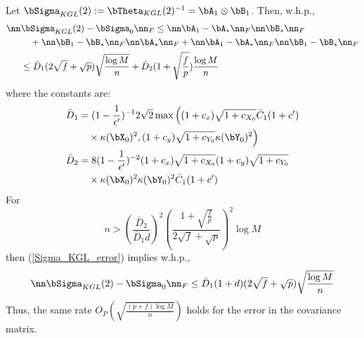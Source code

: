 \begin{IEEEproof}
Let $\bSigma_{KGL}(2):=\bTheta_{KGL}(2)^{-1}=\bA_1\otimes \bB_1$. Then, w.h.p.,
\begin{align}
	\nn & \bSigma_{KGL}(2)-\bSigma_0 \nn_F \leq \nn \bA_1-\bA_*\nn_F \nn \bB_*\nn_F \nonumber \\
		&\quad + \nn \bB_1-\bB_*\nn_F \nn \bA_*\nn_F + \nn\bA_1-\bA_*\nn_F \nn\bB_1-\bB_*\nn_F \nonumber \\
		&\leq \bar{D}_1 (2\sqrt{f}+\sqrt{p}) \sqrt{\frac{\log M}{n}} + \bar{D}_2 (1+\sqrt{\frac{f}{p}}) \frac{\log M}{n} \label{Sigma_KGL_error}
\end{align}
where the constants are:
\begin{align*}
	\bar{D}_1 &= (1-\frac{1}{\epsilon'})^{-1} 2\sqrt{2} \max\Big((1+c_x)\sqrt{1+c_{X_0}} \bar{C}_1 (1+c') \\
		&\quad \times \kappa(\bX_0)^2, (1+c_y) \sqrt{1+c_{Y_0}} \kappa(\bY_0)^2 \Big) \\
	\bar{D}_2 &= 8(1-\frac{1}{\epsilon'})^{-2} (1+c_x)\sqrt{1+c_{X_0}}(1+c_y)\sqrt{1+c_{Y_0}} \\
		&\quad \times \kappa(\bX_0)^2\kappa(\bY_0)^2 \bar{C}_1(1+c')
\end{align*}
For
\begin{equation*}
	n>(\frac{\bar{D}_2}{\bar{D}_1 d})^2 \left(\frac{1+\sqrt{\frac{f}{p}}}{2\sqrt{f}+\sqrt{p}}\right)^2 \log M
\end{equation*}
then (\ref{Sigma_KGL_error}) implies w.h.p.,
\begin{equation*}
	\nn \bSigma_{KGL}(2)-\bSigma_0 \nn_F \leq \bar{D}_1 (1+d) (2\sqrt{f}+\sqrt{p}) \sqrt{\frac{\log M}{n}}
\end{equation*}
Thus, the same rate $O_P\left( \sqrt{\frac{(p+f) \log M}{n}} \right)$ holds for the error in the covariance matrix.




\end{IEEEproof}
